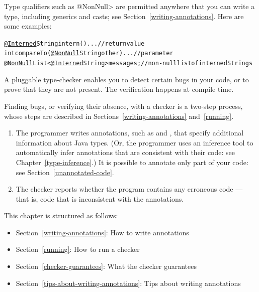 Type qualifiers such as \<@NonNull> are permitted anywhere
that you can write a type, including generics and casts; see
Section~\ref{writing-annotations}.  Here are some examples:

\begin{alltt}
  \underline{@Interned} String intern() \ttlcb{} ... \ttrcb{}             // return value
  int compareTo(\underline{@NonNull} String other) \ttlcb{} ... \ttrcb{}  // parameter
  \underline{@NonNull} List<\underline{@Interned} String> messages;     // non-null list of interned Strings
\end{alltt}



A pluggable type-checker enables you to detect certain bugs in your code,
or to prove that they are not present.  The verification happens at compile
time.


Finding bugs, or verifying their absence, with a checker is a two-step process, whose steps are
described in Sections~\ref{writing-annotations} and~\ref{running}.

\begin{enumerate}

\item The programmer writes annotations, such as  and
  , that specify additional information about Java types.
  (Or, the programmer uses an inference tool to automatically infer
  annotations that are consistent with their code:  see Chapter~\ref{type-inference}.)
  It is possible to annotate only part of your code:  see
  Section~\ref{unannotated-code}.

\item The checker reports whether the program contains any erroneous code
  --- that is, code that is inconsistent with the annotations.

\end{enumerate}

This chapter is structured as follows:
\begin{itemize}
\item Section~\ref{writing-annotations}: How to write annotations
\item Section~\ref{running}:  How to run a checker
\item Section~\ref{checker-guarantees}: What the checker guarantees
\item Section~\ref{tips-about-writing-annotations}: Tips about writing annotations
\end{itemize}

